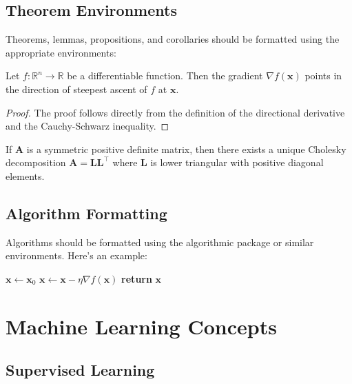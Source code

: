 \documentclass{article}
\begin{document}
\subsection{Theorem Environments}

Theorems, lemmas, propositions, and corollaries should be formatted using
the appropriate environments:

\begin{theorem}
Let $f: \mathbb{R}^n \to \mathbb{R}$ be a differentiable function. Then
the gradient $\nabla f(\mathbf{x})$ points in the direction of steepest
ascent of $f$ at $\mathbf{x}$.
\end{theorem}

\begin{proof}
The proof follows directly from the definition of the directional
derivative and the Cauchy-Schwarz inequality.
\end{proof}

\begin{lemma}
If $\mathbf{A}$ is a symmetric positive definite matrix, then there
exists a unique Cholesky decomposition $\mathbf{A} = \mathbf{L}\mathbf{L}^\top$
where $\mathbf{L}$ is lower triangular with positive diagonal elements.
\end{lemma}

\subsection{Algorithm Formatting}

Algorithms should be formatted using the algorithmic package or similar
environments. Here's an example:

\begin{algorithmic}[1]
    \State $\mathbf{x} \gets \mathbf{x}_0$
        \State $\mathbf{x} \gets \mathbf{x} - \eta \nabla f(\mathbf{x})$
    \EndFor
    \State \textbf{return} $\mathbf{x}$
\EndProcedure
\end{algorithmic}

\section{Machine Learning Concepts}

\subsection{Supervised Learning}
\end{document}
